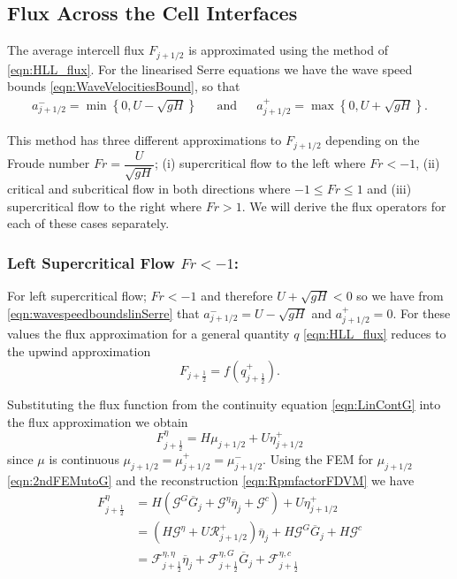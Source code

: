 \subsection{Flux Across the Cell Interfaces}
The average intercell flux $F_{j+1/2}$ is approximated using the method of \citet{Kurganov-etal-2001-707} \eqref{eqn:HLL_flux}. For the linearised Serre equations we have the wave speed bounds \eqref{eqn:WaveVelocitiesBound}, so that
\begin{align}
a^-_{j+ 1/2} = \min \left\lbrace 0,  U - \sqrt{g H} \right \rbrace& &\text{and}& &a^+_{j+ 1/2} =  \max \left\lbrace 0, U + \sqrt{g H} \right \rbrace .
\label{eqn:wavespeedboundslinSerre}
\end{align}

This method has three different approximations to $F_{j+1/2}$ depending on the Froude number $Fr = \dfrac{U}{\sqrt{gH}}$; (i)
supercritical flow to the left where $Fr < -1$, (ii) critical and subcritical flow in both directions where $-1 \le Fr \le 1$ and (iii) supercritical flow to the right where $Fr > 1$. We will derive the flux operators for each of these cases separately.

\subsubsection{Left Supercritical Flow $Fr < -1$:}
For left supercritical flow; $Fr < -1$ and therefore $U + \sqrt{g H} < 0$ so we have from \eqref{eqn:wavespeedboundslinSerre} that $a^-_{j+ 1/2} = U - \sqrt{g H}$ and $a^+_{j+ 1/2} =  0$. For these values the flux approximation for a general quantity $q$ \eqref{eqn:HLL_flux} reduces to the upwind approximation 
\begin{equation}
F_{j+\frac{1}{2}} = f\left(q^+_{j+\frac{1}{2}}\right).
\label{eqn:fluxleftsupercrit}
\end{equation}

Substituting the flux function from the continuity equation \eqref{eqn:LinContG} into the flux approximation we obtain
\begin{equation*}
F^\eta_{j+\frac{1}{2}} = H \mu_{j+1/2} + U \eta^+_{j+1/2}
\end{equation*}
since $\mu$ is continuous $\mu_{j+1/2} = \mu_{j+1/2}^+ = \mu_{j+1/2}^- $. Using the FEM for $\mu_{j+1/2}$ \eqref{eqn:2ndFEMutoG} and the reconstruction \eqref{eqn:RpmfactorFDVM} we have
\begin{align}
F^\eta_{j+\frac{1}{2}} &= H \left(\mathcal{G}^G \overline{G}_{j} + \mathcal{G}^{\eta} \overline{\eta}_{j} + \mathcal{G}^c\right) + U \eta^+_{j+1/2} \nonumber \\ &= \left(H \mathcal{G}^{\eta} + U \mathcal{R}^+_{j+1/2} \right)  \overline{\eta}_{j} + H \mathcal{G}^G \overline{G}_{j} + H\mathcal{G}^c \nonumber \\
&= \mathcal{F}^{\eta, \eta}_{j+\frac{1}{2}} \overline{\eta}_{j} + \mathcal{F}^{\eta, G}_{j+\frac{1}{2}} \overline{G}_{j} + \mathcal{F}^{\eta, c}_{j+\frac{1}{2}}
\label{eqn:Fluxfactorsupercritetaleft}
\end{align}

